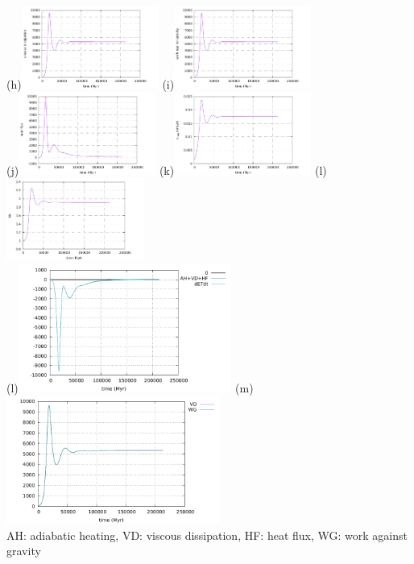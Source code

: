 \begin{center}
(h)\includegraphics[width=4.5cm]{python_codes/fieldstone_compressible2/EBA_104/viscous_dissipation}
(i)\includegraphics[width=4.5cm]{python_codes/fieldstone_compressible2/EBA_104/work_grav}\\
(j)\includegraphics[width=4.5cm]{python_codes/fieldstone_compressible2/EBA_104/heat_flux}
(k)\includegraphics[width=4.5cm]{python_codes/fieldstone_compressible2/EBA_104/vrms}
(l)\includegraphics[width=4.5cm]{python_codes/fieldstone_compressible2/EBA_104/Nu}\\
(l)\includegraphics[width=7cm]{python_codes/fieldstone_compressible2/EBA_104/conservation1}
(m)\includegraphics[width=7cm]{python_codes/fieldstone_compressible2/EBA_104/conservation2}\\
AH: adiabatic heating, VD: viscous dissipation, HF: heat flux, WG: work against gravity
\end{center}

